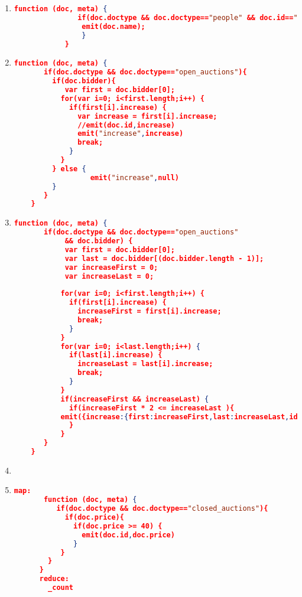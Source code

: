 \label{xmark-queries-couchbase}
\begin{enumerate}[label=Q\arabic*]
	\item \label{cb-q-1}%
	\begin{lstlisting}[language=JSON, basicstyle=\scriptsize]
			function (doc, meta) {
			   if(doc.doctype && doc.doctype=="people" && doc.id=="person0"){
				emit(doc.name);	   
			    }
			}
		\end{lstlisting}

	\item \label{cb-q-2}%
	\begin{lstlisting}[language=JSON, basicstyle=\scriptsize]
	function (doc, meta) {
	   if(doc.doctype && doc.doctype=="open_auctions"){
	     if(doc.bidder){
	     	var first = doc.bidder[0];
	       for(var i=0; i<first.length;i++) {
	         if(first[i].increase) {
	           var increase = first[i].increase;
	           //emit(doc.id,increase)
	           emit("increase",increase)
	           break;
	         }
	       }
	     } else {
	     	      emit("increase",null)
	     }
	   }
	}
	\end{lstlisting}
	
    \item \label{cb-q-3}%
	\begin{lstlisting}[language=JSON, basicstyle=\scriptsize]
	  function (doc, meta) {
       if(doc.doctype && doc.doctype=="open_auctions" 
            && doc.bidder) {
         	var first = doc.bidder[0];
           	var last = doc.bidder[(doc.bidder.length - 1)];
            var increaseFirst = 0;
            var increaseLast = 0;
           
           for(var i=0; i<first.length;i++) {
             if(first[i].increase) {
               increaseFirst = first[i].increase;
               break;
             }
           }
           for(var i=0; i<last.length;i++) {
             if(last[i].increase) {
               increaseLast = last[i].increase;
               break;
             }
           }
           if(increaseFirst && increaseLast) {
             if(increaseFirst * 2 <= increaseLast ){
    	   emit({increase:{first:increaseFirst,last:increaseLast,id:doc.id}});
             }
           } 
       }
    }
	\end{lstlisting}
	
	
    \item \label{cb-q-4}%
	\par
	
	
    \item \label{cb-q-5}%
	\begin{lstlisting}[language=JSON, basicstyle=\scriptsize]
	map:
	   function (doc, meta) {
	      if(doc.doctype && doc.doctype=="closed_auctions"){
	        if(doc.price){
	          if(doc.price >= 40) {
	            emit(doc.id,doc.price)
	          }
	       }
	    }
	  }
	  reduce: 
	    _count
	\end{lstlisting}
	

\end{enumerate}
